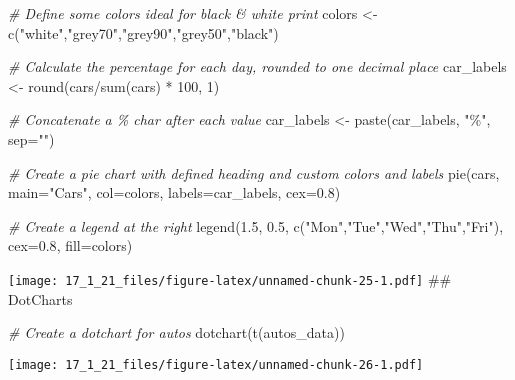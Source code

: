 \documentclass[
]{article}
\newenvironment{Shaded}{\begin{snugshade}}{\end{snugshade}}
\newcommand{\AttributeTok}[1]{\textcolor[rgb]{0.77,0.63,0.00}{#1}}
\newcommand{\CommentTok}[1]{\textcolor[rgb]{0.56,0.35,0.01}{\textit{#1}}}
\newcommand{\DecValTok}[1]{\textcolor[rgb]{0.00,0.00,0.81}{#1}}
\newcommand{\FloatTok}[1]{\textcolor[rgb]{0.00,0.00,0.81}{#1}}
\newcommand{\FunctionTok}[1]{\textcolor[rgb]{0.00,0.00,0.00}{#1}}
\newcommand{\NormalTok}[1]{#1}
\newcommand{\OtherTok}[1]{\textcolor[rgb]{0.56,0.35,0.01}{#1}}
\newcommand{\SpecialCharTok}[1]{\textcolor[rgb]{0.00,0.00,0.00}{#1}}
\newcommand{\StringTok}[1]{\textcolor[rgb]{0.31,0.60,0.02}{#1}}
\begin{document}
\begin{Shaded}
\begin{Highlighting}[]
\CommentTok{\# Define some colors ideal for black \& white print}
\NormalTok{colors }\OtherTok{\textless{}{-}} \FunctionTok{c}\NormalTok{(}\StringTok{"white"}\NormalTok{,}\StringTok{"grey70"}\NormalTok{,}\StringTok{"grey90"}\NormalTok{,}\StringTok{"grey50"}\NormalTok{,}\StringTok{"black"}\NormalTok{)}

\CommentTok{\# Calculate the percentage for each day, rounded to one decimal place}
\NormalTok{car\_labels }\OtherTok{\textless{}{-}} \FunctionTok{round}\NormalTok{(cars}\SpecialCharTok{/}\FunctionTok{sum}\NormalTok{(cars) }\SpecialCharTok{*} \DecValTok{100}\NormalTok{, }\DecValTok{1}\NormalTok{)}

\CommentTok{\# Concatenate a \textquotesingle{}\%\textquotesingle{} char after each value}
\NormalTok{car\_labels }\OtherTok{\textless{}{-}} \FunctionTok{paste}\NormalTok{(car\_labels, }\StringTok{"\%"}\NormalTok{, }\AttributeTok{sep=}\StringTok{""}\NormalTok{)}

\CommentTok{\# Create a pie chart with defined heading and custom colors and labels}
\FunctionTok{pie}\NormalTok{(cars, }\AttributeTok{main=}\StringTok{"Cars"}\NormalTok{, }\AttributeTok{col=}\NormalTok{colors, }\AttributeTok{labels=}\NormalTok{car\_labels, }\AttributeTok{cex=}\FloatTok{0.8}\NormalTok{)}

\CommentTok{\# Create a legend at the right}
\FunctionTok{legend}\NormalTok{(}\FloatTok{1.5}\NormalTok{, }\FloatTok{0.5}\NormalTok{, }\FunctionTok{c}\NormalTok{(}\StringTok{"Mon"}\NormalTok{,}\StringTok{"Tue"}\NormalTok{,}\StringTok{"Wed"}\NormalTok{,}\StringTok{"Thu"}\NormalTok{,}\StringTok{"Fri"}\NormalTok{), }\AttributeTok{cex=}\FloatTok{0.8}\NormalTok{, }\AttributeTok{fill=}\NormalTok{colors)}
\end{Highlighting}
\end{Shaded}

\texttt{[image: 17\_1\_21\_files/figure-latex/unnamed-chunk-25-1.pdf]} \#\#
DotCharts

\begin{Shaded}
\begin{Highlighting}[]
\CommentTok{\# Create a dotchart for autos}
\FunctionTok{dotchart}\NormalTok{(}\FunctionTok{t}\NormalTok{(autos\_data))}
\end{Highlighting}
\end{Shaded}

\texttt{[image: 17\_1\_21\_files/figure-latex/unnamed-chunk-26-1.pdf]}
\end{document}
